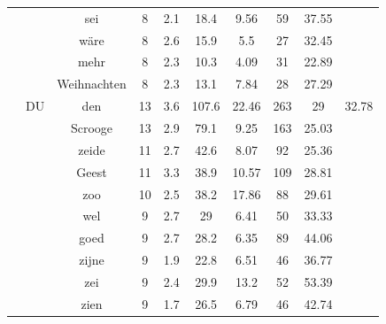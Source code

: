 \documentclass[shortpaper]{revdetua}
\begin{document}
\begin{table}[H]
\begin{tabular}{@{}cccccccccc@{}}
     & \multicolumn{1}{l|}{}   & sei         & 8            & 2.1              & 18.4         & 9.56    & 59      & 37.55             &              \\
     & \multicolumn{1}{l|}{}   & wäre        & 8            & 2.6              & 15.9         & 5.5     & 27      & 32.45             &              \\
     & \multicolumn{1}{l|}{}   & mehr        & 8            & 2.3              & 10.3         & 4.09    & 31      & 22.89             &              \\
     & \multicolumn{1}{l|}{}   & Weihnachten & 8            & 2.3              & 13.1         & 7.84    & 28      & 27.29             &              \\ \cmidrule(l){2-10} 
     & \multicolumn{1}{l|}{DU} & den         & 13           & 3.6              & 107.6        & 22.46   & 263     & 29                & 32.78        \\
     & \multicolumn{1}{l|}{}   & Scrooge     & 13           & 2.9              & 79.1         & 9.25    & 163     & 25.03             &              \\
     & \multicolumn{1}{l|}{}   & zeide       & 11           & 2.7              & 42.6         & 8.07    & 92      & 25.36             &              \\
     & \multicolumn{1}{l|}{}   & Geest       & 11           & 3.3              & 38.9         & 10.57   & 109     & 28.81             &              \\
     & \multicolumn{1}{l|}{}   & zoo         & 10           & 2.5              & 38.2         & 17.86   & 88      & 29.61             &              \\
     & \multicolumn{1}{l|}{}   & wel         & 9            & 2.7              & 29           & 6.41    & 50      & 33.33             &              \\
     & \multicolumn{1}{l|}{}   & goed        & 9            & 2.7              & 28.2         & 6.35    & 89      & 44.06             &              \\
     & \multicolumn{1}{l|}{}   & zijne       & 9            & 1.9              & 22.8         & 6.51    & 46      & 36.77             &              \\
     & \multicolumn{1}{l|}{}   & zei         & 9            & 2.4              & 29.9         & 13.2    & 52      & 53.39             &              \\
     & \multicolumn{1}{l|}{}   & zien        & 9            & 1.7              & 26.5         & 6.79    & 46      & 42.74             &              \\ \cmidrule(l){2-10} 

\end{tabular}
\end{table}
\end{document}
